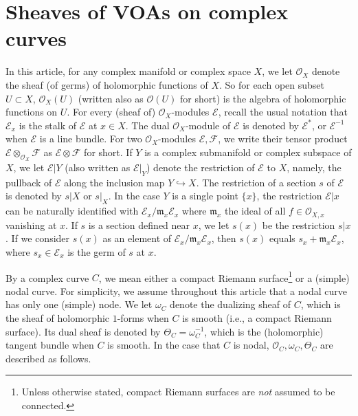 \documentclass[11pt,b5paper,notitlepage]{article}
\theoremstyle{definition}
\theoremstyle{plain}
\newcommand{\fk}{\mathfrak}
\newcommand{\scr}{\mathscr}
\numberwithin{equation}{section}
\begin{document}
\section{Sheaves of VOAs on complex curves}\label{lb5}



In this article, for any complex manifold or complex space $X$, we let $\scr O_X$ denote the sheaf (of germs) of holomorphic functions of $X$. So for each open subset $U\subset X$, $\scr O_X(U)$ (written also as $\scr O(U)$ for short) \index{OX@$\scr O_X,\scr O(U)$} is the algebra of holomorphic functions on $U$. For every (sheaf of) $\scr O_X$-modules $\scr E$, recall the usual notation that $\scr E_x$ \index{Ex@$\scr E_x$} is the stalk of $\scr E$ at $x\in X$. The dual $\scr O_X$-module of $\scr E$ is denoted by $\scr E^*$, or $\scr E^{-1}$ when $\scr E$ is a line bundle. For two $\scr O_X$-modules $\scr E,\scr F$, we write their tensor product $\scr E\otimes_{\scr O_X}\scr F$ as $\scr E\otimes\scr F$ for short. If $Y$ is a complex submanifold or complex subspace of $X$, we let $\scr E|Y$ (also written as $\scr E|_Y$) denote the restriction of $\scr E$ to $X$, namely, the pullback of $\scr E$ along the inclusion map $Y\hookrightarrow X$. \index{EY@$\scr E\lvert Y=\scr E\lvert_Y,\scr E\lvert x$} The restriction of a section $s$ of $\scr E$ is denoted by $s|X$ or $s|_X$. In the case $Y$ is a single point $\{x\}$, the restriction $\scr E|x$ can be naturally identified with $\scr E_x/\fk m_x\scr E_x$ where $\fk m_x$ the  ideal of all $f\in\scr O_{X,x}$ vanishing at $x$. If $s$ is a section defined near $x$, we let $s(x)$ be the restriction $s|x$. If we consider $s(x)$ as an element of $\scr E_x/\fk m_x\scr E_x$, then $s(x)$ equals $s_x+\fk m_x\scr E_x$, where $s_x\in\scr E_x$ is the germ of $s$ at $x$.

By a complex curve $C$, we mean  either a compact Riemann surface\footnote{Unless otherwise stated, compact Riemann surfaces are \emph{not} assumed to be connected.} or a (simple) nodal curve. For simplicity, we assume throughout this article that a nodal curve has only one (simple) node. We let $\omega_C$ denote the dualizing sheaf of $C$, which is the sheaf of holomorphic $1$-forms when $C$ is smooth (i.e., a compact Riemann surface).  Its dual sheaf is denoted by $\Theta_C=\omega_C^{-1}$, which is the (holomorphic) tangent bundle when $C$ is smooth. In the case that $C$ is nodal, $\scr O_C,\omega_C,\Theta_C$ are described as follows.
\end{document}
